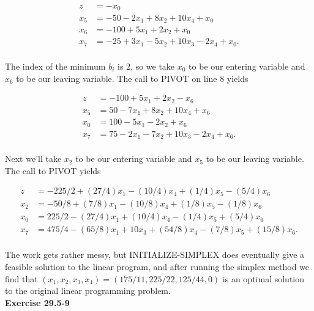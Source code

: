 \documentclass{article}
\begin{document}
\begin{align*}
z &=-x_0 \\
x_5 &=-50 - 2x_1 + 8x_2 + 10x_4 + x_0  \\
x_6 &= -100 + 5x_1 + 2x_2 + x_0\\
x_7 &= -25 + 3x_1 - 5x_2 + 10x_3 - 2x_4 + x_0.\\
\end{align*}

The index of the minimum $b_i$ is 2, so we take $x_0$ to be our entering variable and $x_6$ to be our leaving variable.  The call to PIVOT on line 8 yields

\begin{align*}
z &=  -100 + 5x_1 + 2x_2 - x_6 \\
x_5 &=50 - 7x_1 + 8x_2 + 10x_4 + x_6  \\
x_0 &= 100 - 5x_1 - 2x_2 + x_6\\
x_7 &= 75 - 2x_1 - 7x_2 + 10x_3 - 2x_4 + x_6.\\
\end{align*}

Next we'll take $x_2$ to be our entering variable and $x_5$ to be our leaving variable.  The call to PIVOT yields

\begin{align*}
z &=  -225/2 + (27/4)x_1 - (10/4)x_4 + (1/4)x_5 - (5/4)x_6 \\
x_2 &= -50/8 + (7/8)x_1 - (10/8)x_4 + (1/8)x_5 - (1/8)x_6  \\
x_0 &= 225/2 - (27/4)x_1 + (10/4)x_4 - (1/4)x_5 + (5/4)x_6\\
x_7 &= 475/4 - (65/8)x_1 + 10x_3 + (54/8)x_4 - (7/8)x_5 + (15/8)x_6.\\
\end{align*}

The work gets rather messy, but INITIALIZE-SIMPLEX does eventually give a feasible solution to the linear program, and after running the simplex method we find that $(x_1,x_2,x_3,x_4) = (175/11,225/22,125/44,0)$ is an optimal solution to the original linear programming problem.  \\

\noindent\textbf{Exercise 29.5-9}\\
\end{document}
